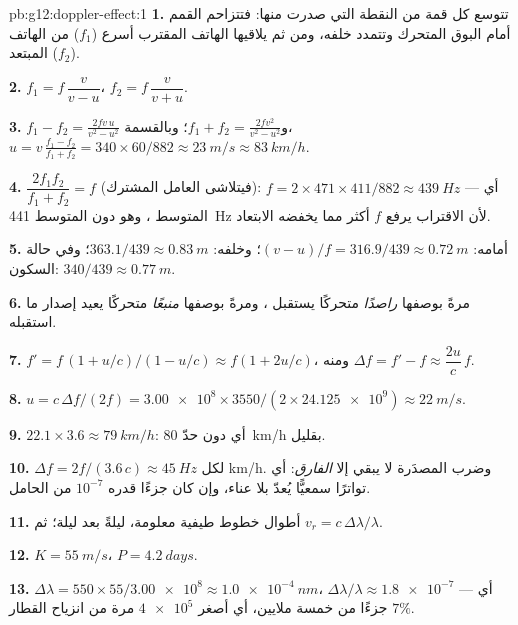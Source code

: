 \begin{solution}{pb:g12:doppler-effect:1}
\textbf{1.} تتوسع كل قمة من النقطة التي صدرت منها: فتتزاحم القمم أمام
البوق المتحرك وتتمدد خلفه، ومن ثم يلاقيها الهاتف المقترب أسرع
($f_1$) من الهاتف المبتعد ($f_2$).

\textbf{2.} $f_1 = f\,\dfrac{v}{v - u}$، \quad $f_2 = f\,\dfrac{v}{v + u}$.

\textbf{3.} $f_1 - f_2 = \frac{2fv\,u}{v^2 - u^2}$ و$f_1 + f_2 =
\frac{2fv^2}{v^2 - u^2}$؛ وبالقسمة، $u = v\,\frac{f_1 - f_2}{f_1 + f_2} =
340 \times 60/882 \approx \qty{23}{m/s} \approx \qty{83}{km/h}$.

\textbf{4.} $\dfrac{2f_1 f_2}{f_1 + f_2} = f$ (فيتلاشى العامل المشترك):
$f = 2 \times 471 \times 411/882 \approx \qty{439}{Hz}$ --- أي المتوسط ، وهو دون
المتوسط \qty{441}{Hz} لأن الاقتراب يرفع $f$ أكثر مما يخفضه الابتعاد.

\textbf{5.} أمامه: $(v - u)/f = 316.9/439 \approx \qty{0.72}{m}$؛ وخلفه:
$363.1/439 \approx \qty{0.83}{m}$؛ وفي حالة السكون: $340/439 \approx \qty{0.77}{m}$.

\textbf{6.} مرةً بوصفها \emph{راصدًا} متحركًا يستقبل ، ومرةً بوصفها
\emph{منبعًا} متحركًا يعيد إصدار ما استقبله.

\textbf{7.} $f' = f\,(1 + u/c)/(1 - u/c) \approx f(1 + 2u/c)$، ومنه
$\Delta f = f' - f \approx \dfrac{2u}{c}\,f$.

\textbf{8.} $u = c\,\Delta f/(2f) = \num{3.00e8} \times 3550/(2 \times \num{24.125e9})
\approx \qty{22}{m/s}$.

\textbf{9.} $22.1 \times 3.6 \approx \qty{79}{km/h}$: أي دون حدّ \qty{80}{km/h}
بقليل.

\textbf{10.} $\Delta f = 2f/(3.6\,c) \approx \qty{45}{Hz}$ لكل \unit{km/h}. وضرب
  المصدَرة لا يبقي إلا \emph{الفارق}: أي تواترًا سمعيًّا
يُعدّ بلا عناء، وإن كان جزءًا قدره $10^{-7}$ من الحامل.

\textbf{11.} أطوال  خطوط طيفية معلومة، ليلةً بعد ليلة؛ ثم
$v_r = c\,\Delta\lambda/\lambda$.

\textbf{12.} $K = \qty{55}{m/s}$، $P = \qty{4.2}{days}$.

\textbf{13.} $\Delta\lambda = 550 \times 55/\num{3.00e8} \approx \qty{1.0e-4}{nm}$،
$\Delta\lambda/\lambda \approx \num{1.8e-7}$ --- أي جزءًا من خمسة ملايين، أي أصغر
$\num{4e5}$ مرة من انزياح القطار $7\%$.


\end{solution}
